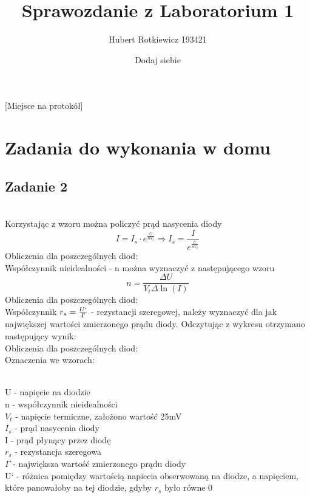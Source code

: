 \documentclass{article}
\title{Sprawozdanie z Laboratorium 1}
\author{
  Hubert Rotkiewicz 193421 \and 
Dodaj siebie
}
\begin{document}
[Miejsce na protokół]
\maketitle
\section{Zadania do wykonania w domu}
\subsection{Zadanie 2}
 \\
Korzystając z wzoru można policzyć prąd nasycenia diody\[
  I = I_s \cdot e^{\frac{U}{nV_t}} \Rightarrow
  I_s = \frac{I}{e^{\frac{U}{nV_t}}} 
\]
Obliczenia dla poszczególnych diod: \\
Współczynnik nieidealności - n można wyznaczyć z następującego wzoru \[
  n = \frac{\Delta{U}}{V_t \Delta{\ln(I)}}
\]
Obliczenia dla poszczególnych diod: \\
Współczynnik $r_s=\frac{U`}{\Gamma}$ - rezystancji szeregowej, należy wyznaczyć dla jak największej wartości zmierzonego prądu diody. Odczytując z wykresu otrzymano następujący wynik:\\
Obliczenia dla poszczególnych diod: \\
Oznaczenia we wzorach:
\raggedright
\\ U - napięcie na diodzie\\ n - współczynnik nieidealności\\ $V_t$ - napięcie termiczne, założono wartość 25mV\\ 
$I_s$ - prąd nasycenia diody\\ I - prąd płynący przez diodę\\ $r_s$ - rezystancja szeregowa\\ $\Gamma$ - największa wartość zmierzonego prądu diody \\
U` - różnica pomiędzy wartością napiecia obserwowaną na diodze, a napięciem, które panowałoby na tej diodzie, gdyby $r_s$ było równe 0\\
\break
\raggedright
\end{document}
